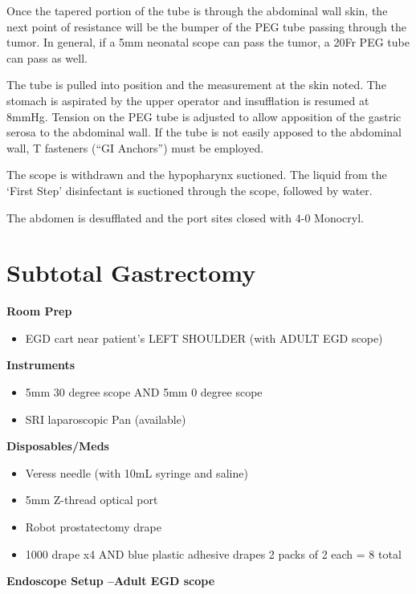 \documentclass[
  letterpaper,
]{scrbook}
\providecommand{\tightlist}{%
  \setlength{\itemsep}{0pt}\setlength{\parskip}{0pt}}
\begin{document}
Once the tapered portion of the tube is through the abdominal wall skin,
the next point of resistance will be the bumper of the PEG tube passing
through the tumor. In general, if a 5mm neonatal scope can pass the
tumor, a 20Fr PEG tube can pass as well.

The tube is pulled into position and the measurement at the skin noted.
The stomach is aspirated by the upper operator and insufflation is
resumed at 8mmHg. Tension on the PEG tube is adjusted to allow
apposition of the gastric serosa to the abdominal wall. If the tube is
not easily apposed to the abdominal wall, T fasteners (``GI Anchors'')
must be employed.

The scope is withdrawn and the hypopharynx suctioned. The liquid from
the `First Step' disinfectant is suctioned through the scope, followed
by water.

The abdomen is desufflated and the port sites closed with 4-0 Monocryl.

\chapter{Subtotal Gastrectomy}\label{robo_stgastrectomy_salo}

\textbf{Room Prep}

\begin{itemize}
\tightlist
\item
  EGD cart near patient's LEFT SHOULDER (with ADULT EGD scope)
\end{itemize}

\textbf{Instruments}

\begin{itemize}
\tightlist
\item
  5mm 30 degree scope AND 5mm 0 degree scope
\item
  SRI laparoscopic Pan (available)
\end{itemize}

\textbf{Disposables/Meds}

\begin{itemize}
\tightlist
\item
  Veress needle (with 10mL syringe and saline)
\item
  5mm Z-thread optical port
\item
  Robot prostatectomy drape
\item
  1000 drape x4 AND blue plastic adhesive drapes 2 packs of 2 each = 8
  total
\end{itemize}

\textbf{Endoscope Setup --Adult EGD scope}
\end{document}
